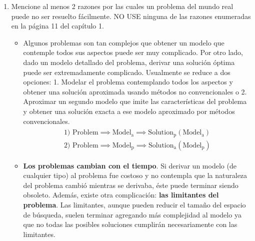 \documentclass[10pt,letterpaper]{article}
\begin{document}
\begin{enumerate}
            \begin{enumerate}
                \item Mencione al menos 2 razones por las cuales un problema del
                      mundo real puede no ser resuelto fácilmente. NO USE ninguna
                      de las razones enumeradas en la página 11 del capítulo 1.
                      \begin{itemize}
                          \item Algunos problemas son tan complejos que obtener
                                un modelo que contemple todos sus aspectos puede
                                ser muy complicado. Por otro lado, dado un modelo
                                detallado del problema, derivar una solución óptima
                                puede ser extremadamente complicado.
                                Usualmente se reduce a dos opciones: 1. Modelar el
                                problema contemplando todos los aspectos y obtener una
                                solución aproximada usando métodos no convencionales
                                o 2. Aproximar un segundo modelo que imite las
                                características del problema y obtener una solución
                                exacta a ese modelo aproximado por métodos convencionales.
                                \begin{equation*} \begin{split} \begin{gathered}
                                    \text{1) }\mathrm{Problem} \implies \mathrm{Model_a} \implies \mathrm{Solution_p}(\mathrm{Model_a}) \\
                                    \text{2) }\mathrm{Problem} \implies \mathrm{Model_p} \implies \mathrm{Solution_a}(\mathrm{Model_p})
                                \end{gathered} \end{split} \end{equation*}
                          \item \textbf{Los problemas cambian con el tiempo}. Si derivar un modelo
                                (de cualquier tipo) al problema fue costoso y no contempla
                                que la naturaleza del problema cambió mientras se derivaba,
                                éste puede terminar siendo obsoleto. Además, existe otra
                                complicación: \textbf{las limitantes del problema}. Las
                                limitantes, aunque pueden reducir el tamaño del espacio
                                de búsqueda, suelen terminar agregando más complejidad
                                al modelo ya que no todas las posibles soluciones cumplirán
                                necesariamente con las limitantes.
                      \end{itemize}


\end{enumerate}
\end{enumerate}
\end{document}
